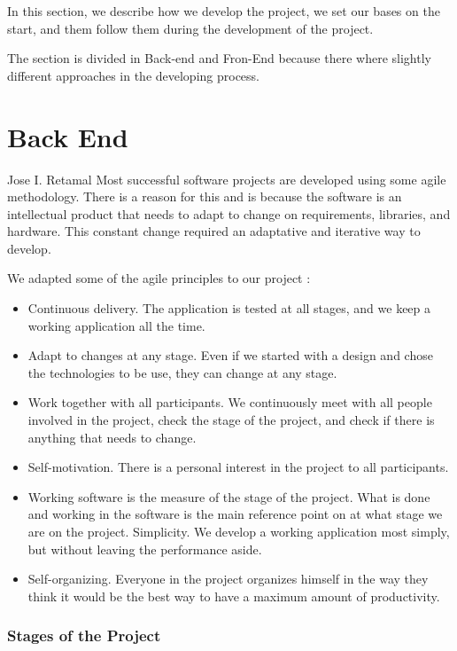 \indent
\indent
In this section, we describe how we develop the project, we set our bases on the start, and them follow them during the development of the project.
 
The section is divided in Back-end and Fron-End because there where slightly different approaches in the developing process.

\section{Back End}
Jose I. Retamal
\vskip 0.1in
\indent
\indent
Most successful software projects are developed using some agile methodology\cite{agilemanifesto}. There is a reason for this and is because the software is an intellectual product that needs to adapt to change on requirements, libraries, and hardware. This constant change required an adaptative and iterative way to develop.

We adapted some of the agile principles to our project \cite{agilemanifesto}:
\begin{itemize}
	\item Continuous delivery. The application is tested at all stages, and we keep a working application all the time.
	\item Adapt to changes at any stage. Even if we started with a design and chose the technologies to be use, they can change at any stage. 
   	\item 	Work together with all participants. We continuously meet with all people involved in the project, check the stage of the project, and check if there is anything that needs to change.
	\item	Self-motivation. There is a personal interest in the project to all participants.
	\item	Working software is the measure of the stage of the project. What is done and working in the software is the main reference point on at what stage we are on the project.
	Simplicity. We develop a working application most simply, but without leaving the performance aside.
	\item	Self-organizing. Everyone in the project organizes himself in the way they think it would be the best way to have a maximum amount of productivity. 
\end{itemize}



\subsubsection{Stages of the Project}

